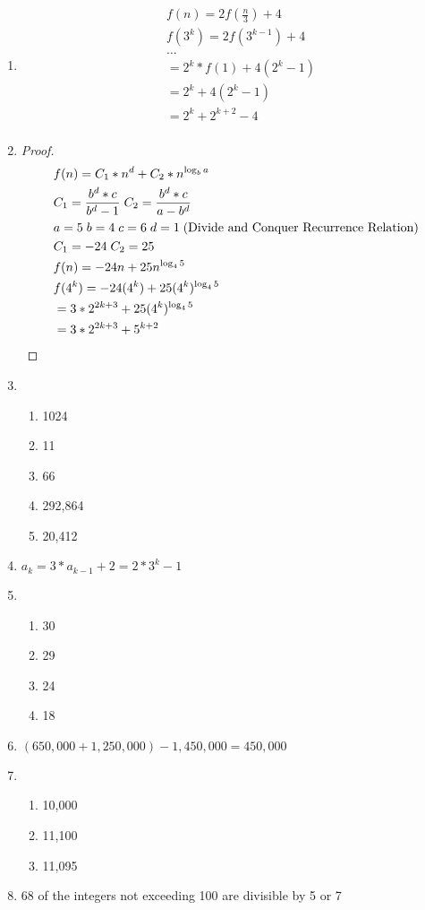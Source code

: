 \documentclass[11pt]{article}
\begin{document}
\begin{enumerate}
    \item \begin{align*}
        & f(n) = 2f(\frac{n}{3}) + 4 \\
        & f(3^k) = 2f(3^{k-1}) + 4 \\
        & \dots \\
        & = 2^k * f(1) + 4(2^k - 1) \\
        & = 2^k + 4(2^k - 1) \\
        & = 2^k + 2^{k+2} - 4 \\
    \end{align*}
    \item \begin{proof}
        \begin{align*}
            & f(n) = C_1 * n^d + C_2 * n^{\log_b{a}} \\
            & C_1 = \frac{b^d * c}{b^d - 1} \; C_2 = \frac{b^d * c}{a - b^d} \\
            & a = 5 \; b = 4 \; c = 6 \; d = 1 \; \text{(Divide and Conquer Recurrence Relation)}\\
            & C_1 = -24 \; C_2 = 25 \\
            & f(n) = -24n + 25n^{\log_4{5}} \\
            & f(4^k) = -24(4^k) + 25(4^k)^{\log_4{5}} \\
            & = 3 * 2^{2k+3} + 25(4^k)^{\log_4{5}} \\
            & = 3 * 2^{2k+3} + 5^{k+2} \qedhere
        \end{align*}
    \end{proof}
    \item \begin{enumerate}
        \item 1024
        \item 11
        \item 66
        \item 292,864
        \item 20,412
    \end{enumerate}
    \item $ a_k = 3*a_{k-1} + 2 = 2*3^k - 1  $
    \item \begin{enumerate}
        \item 30
        \item 29
        \item 24
        \item 18
    \end{enumerate}
    \item $(650,000+1,250,000) - 1,450,000 = 450,000$
    \item \begin{enumerate}
        \item 10,000
        \item 11,100
        \item 11,095
    \end{enumerate}
    \item 68 of the integers not exceeding 100 are divisible by 5 or 7
\end{enumerate}
\end{document}
